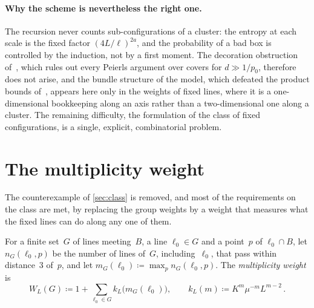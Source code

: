 \documentclass[11pt,letterpaper]{article}
\begin{document}
\begin{enumerate}
\end{enumerate}

\paragraph{Why the scheme is nevertheless the right one.} The recursion never counts sub-configurations of a cluster: the entropy at each scale is the fixed factor $(4L/\ell)^{2a}$, and the probability of a bad box is controlled by the induction, not by a first moment. The decoration obstruction of~\cite{DEC26}, which rules out every Peierls argument over covers for $d\gg1/p_0$, therefore does not arise, and the bundle structure of the model, which defeated the product bounds of~\cite{PS26}, appears here only in the weights of fixed lines, where it is a one-dimensional bookkeeping along an axis rather than a two-dimensional one along a cluster. The remaining difficulty, the formulation of the class of fixed configurations, is a single, explicit, combinatorial problem.

\section{The multiplicity weight}
\label{sec:multiplicity}

The counterexample of \cref{sec:class} is removed, and most of the requirements on the class are met, by replacing the group weights by a weight that measures what the fixed lines can do along any one of them.

\begin{definition}
\label{def:multweight}
For a finite set~$G$ of lines meeting~$B$, a line $\ell_0\in G$ and a point~$p$ of $\ell_0\cap B$, let $n_G(\ell_0,p)$ be the number of lines of~$G$, including~$\ell_0$, that pass within distance~$3$ of~$p$, and let $m_G(\ell_0)\coloneqq\max_pn_G(\ell_0,p)$. The \emph{multiplicity weight} is
\begin{equation}
\label{eq:multweight}
  W_L(G)\coloneqq1+\sum_{\ell_0\in G}k_L\bigl(m_G(\ell_0)\bigr),\qquad k_L(m)\coloneqq K^m\mu^{-m}L^{m-2}\,.
\end{equation}
\end{definition}
\end{document}

